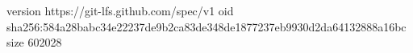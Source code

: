 version https://git-lfs.github.com/spec/v1
oid sha256:584a28babc34e22237de9b2ca83de348de1877237eb9930d2da64132888a16bc
size 602028

